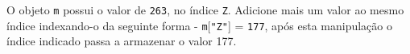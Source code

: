 \documentclass[12pt,varwidth=16cm,border=1pt]{standalone}
\begin{document}
O objeto \verb+m+ possui o valor de \verb+263+, no índice \verb+Z+. Adicione mais um valor ao mesmo índice indexando-o da seguinte forma - \verb+m+[\verb+"Z"+] = \verb+177+, após esta manipulação o índice indicado  passa a armazenar o valor 177.

\questiomtrue
\end{document}
